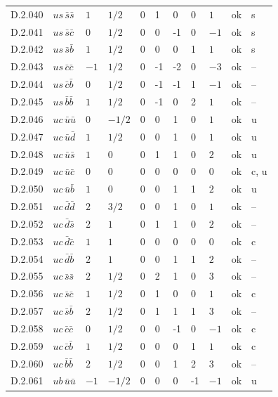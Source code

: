 {\begin{longtable}{@{}llllllllll>{\raggedright\arraybackslash}p{2.0cm}@{}}
D.2.040 & $us\,\bar{s}\bar{s}$ & $1$ & $1/2$ & $0$ & 1 & 0 & 0 & $1$ & ok & s \\
D.2.041 & $us\,\bar{s}\bar{c}$ & $0$ & $1/2$ & $0$ & 0 & -1 & 0 & $-1$ & ok & s \\
D.2.042 & $us\,\bar{s}\bar{b}$ & $1$ & $1/2$ & $0$ & 0 & 0 & 1 & $1$ & ok & s \\
D.2.043 & $us\,\bar{c}\bar{c}$ & $-1$ & $1/2$ & $0$ & -1 & -2 & 0 & $-3$ & ok & -- \\
D.2.044 & $us\,\bar{c}\bar{b}$ & $0$ & $1/2$ & $0$ & -1 & -1 & 1 & $-1$ & ok & -- \\
D.2.045 & $us\,\bar{b}\bar{b}$ & $1$ & $1/2$ & $0$ & -1 & 0 & 2 & $1$ & ok & -- \\
D.2.046 & $uc\,\bar{u}\bar{u}$ & $0$ & $-1/2$ & $0$ & 0 & 1 & 0 & $1$ & ok & u \\
D.2.047 & $uc\,\bar{u}\bar{d}$ & $1$ & $1/2$ & $0$ & 0 & 1 & 0 & $1$ & ok & u \\
D.2.048 & $uc\,\bar{u}\bar{s}$ & $1$ & $0$ & $0$ & 1 & 1 & 0 & $2$ & ok & u \\
D.2.049 & $uc\,\bar{u}\bar{c}$ & $0$ & $0$ & $0$ & 0 & 0 & 0 & $0$ & ok & c, u \\
D.2.050 & $uc\,\bar{u}\bar{b}$ & $1$ & $0$ & $0$ & 0 & 1 & 1 & $2$ & ok & u \\
D.2.051 & $uc\,\bar{d}\bar{d}$ & $2$ & $3/2$ & $0$ & 0 & 1 & 0 & $1$ & ok & -- \\
D.2.052 & $uc\,\bar{d}\bar{s}$ & $2$ & $1$ & $0$ & 1 & 1 & 0 & $2$ & ok & -- \\
D.2.053 & $uc\,\bar{d}\bar{c}$ & $1$ & $1$ & $0$ & 0 & 0 & 0 & $0$ & ok & c \\
D.2.054 & $uc\,\bar{d}\bar{b}$ & $2$ & $1$ & $0$ & 0 & 1 & 1 & $2$ & ok & -- \\
D.2.055 & $uc\,\bar{s}\bar{s}$ & $2$ & $1/2$ & $0$ & 2 & 1 & 0 & $3$ & ok & -- \\
D.2.056 & $uc\,\bar{s}\bar{c}$ & $1$ & $1/2$ & $0$ & 1 & 0 & 0 & $1$ & ok & c \\
D.2.057 & $uc\,\bar{s}\bar{b}$ & $2$ & $1/2$ & $0$ & 1 & 1 & 1 & $3$ & ok & -- \\
D.2.058 & $uc\,\bar{c}\bar{c}$ & $0$ & $1/2$ & $0$ & 0 & -1 & 0 & $-1$ & ok & c \\
D.2.059 & $uc\,\bar{c}\bar{b}$ & $1$ & $1/2$ & $0$ & 0 & 0 & 1 & $1$ & ok & c \\
D.2.060 & $uc\,\bar{b}\bar{b}$ & $2$ & $1/2$ & $0$ & 0 & 1 & 2 & $3$ & ok & -- \\
D.2.061 & $ub\,\bar{u}\bar{u}$ & $-1$ & $-1/2$ & $0$ & 0 & 0 & -1 & $-1$ & ok & u \\

\end{longtable}}
